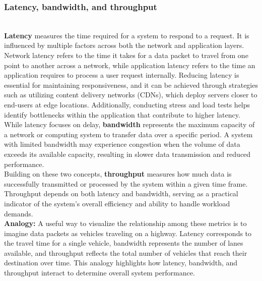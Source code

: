 \subsubsection{Latency, bandwidth, and throughput}\label{mdxFXqbh0nkf1Nvc6GBWP}
\\
\textbf{Latency} measures the time required for a system to respond to a request. It is influenced by multiple factors across both the network and application layers. Network latency refers to the time it takes for a data packet to travel from one point to another across a network, while application latency refers to the time an application requires to process a user request internally. Reducing latency is essential for maintaining responsiveness, and it can be achieved through strategies such as utilizing content delivery networks (CDNs), which deploy servers closer to end-users at edge locations. Additionally, conducting stress and load tests helps identify bottlenecks within the application that contribute to higher latency.
\\
While latency focuses on delay, \textbf{bandwidth} represents the maximum capacity of a network or computing system to transfer data over a specific period. A system with limited bandwidth may experience congestion when the volume of data exceeds its available capacity, resulting in slower data transmission and reduced performance.
\\
Building on these two concepts, \textbf{throughput} measures how much data is successfully transmitted or processed by the system within a given time frame. Throughput depends on both latency and bandwidth, serving as a practical indicator of the system's overall efficiency and ability to handle workload demands.
\\
\textbf{Analogy:} A useful way to visualize the relationship among these metrics is to imagine data packets as vehicles traveling on a highway. Latency corresponds to the travel time for a single vehicle, bandwidth represents the number of lanes available, and throughput reflects the total number of vehicles that reach their destination over time. This analogy highlights how latency, bandwidth, and throughput interact to determine overall system performance.

